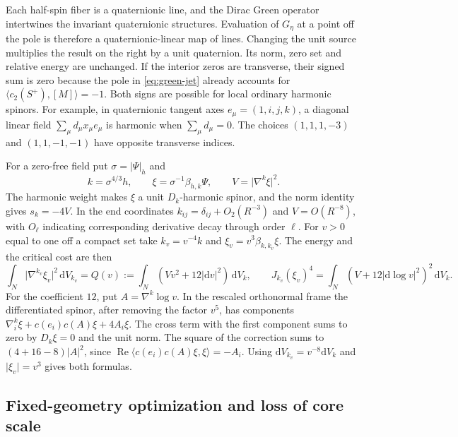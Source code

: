 \documentclass[11pt]{article}
\numberwithin{equation}{section}
\newcommand{\dd}{\mathrm{d}}
\newcommand{\ip}[2]{\langle #1,#2\rangle}
\newcommand{\abs}[1]{\lvert #1\rvert}
\begin{document}
Each half-spin fiber is a quaternionic line, and the Dirac Green
operator intertwines the invariant quaternionic structures. Evaluation
of \(G_\eta\) at a point off the pole is therefore a quaternionic-linear
map of lines. Changing the unit source multiplies the result on
the right by a unit quaternion. Its norm, zero set and relative
energy are unchanged. If the interior zeros are transverse, their
signed sum is zero because the pole in \eqref{eq:green-jet} already
accounts for \(\langle c_2(S^+),[M]\rangle=-1\).
Both signs are possible for local ordinary harmonic spinors.
For example, in quaternionic tangent axes
\(e_\mu=(1,i,j,k)\), a diagonal linear field
\(\sum_\mu d_\mu x_\mu e_\mu\) is harmonic when
\(\sum_\mu d_\mu=0\). The choices \((1,1,1,-3)\) and
\((1,1,-1,-1)\) have opposite transverse indices.

For a zero-free field put \(\sigma=\abs{\Psi}_h\) and
\[
 k=\sigma^{4/3}h,\qquad \xi=\sigma^{-1}\beta_{h,k}\Psi,\qquad
 V=\abs{\nabla^k\xi}^2 .
\]
The harmonic weight makes \(\xi\) a unit \(D_k\)-harmonic spinor,
and the norm identity gives \(s_k=-4V\).
In the end coordinates \(k_{ij}=\delta_{ij}+O_2(R^{-3})\) and
\(V=O(R^{-8})\), with \(O_\ell\) indicating corresponding derivative
decay through order \(\ell\). For \(v>0\) equal to one off a compact
set take \(k_v=v^{-4}k\) and \(\xi_v=v^3\beta_{k,k_v}\xi\).
The energy and the critical cost are then
\begin{equation}\label{eq:harmonic-energy}
 \int_N\abs{\nabla^{k_v}\xi_v}^2\,\dd V_{k_v}
 = Q(v):=\int_N (Vv^2+12\abs{\dd v}^2)\,\dd V_k,\qquad
 J_{k_v}(\xi_v)^4=\int_N (V+12\abs{\dd\log v}^2)^2\,\dd V_k .
\end{equation}
For the coefficient \(12\), put \(A=\nabla^k\log v\).
In the rescaled orthonormal frame the differentiated spinor,
after removing the factor \(v^5\), has components
\(\nabla^k_i\xi+c(e_i)c(A)\xi+4A_i\xi\).
The cross term with the first component sums to zero by \(D_k\xi=0\)
and the unit norm. The square of the correction sums to
\((4+16-8)\abs A^2\), since
\(\operatorname{Re}\ip{c(e_i)c(A)\xi}{\xi}=-A_i\).
Using \(\dd V_{k_v}=v^{-8}\dd V_k\) and \(\abs{\xi_v}=v^3\) gives
both formulas.

\subsection{Fixed-geometry optimization and loss of core scale}
\end{document}
